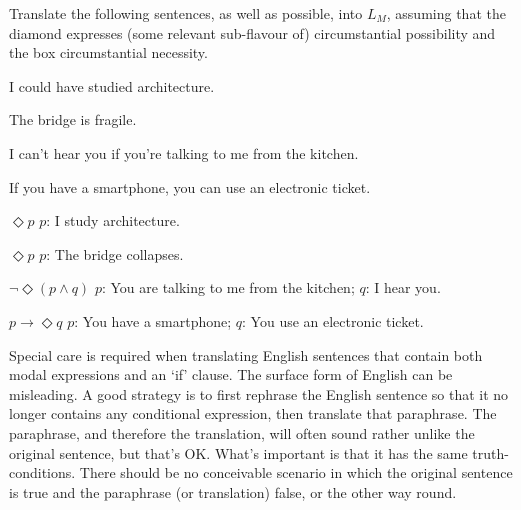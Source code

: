 \begin{exercise}
  Translate the following sentences, as well as possible, into $L_{M}$, assuming
  that the diamond expresses (some relevant sub-flavour of) circumstantial
  possibility and the box circumstantial necessity.
  \begin{exlist}
  \item I could have studied architecture.
  \item The bridge is fragile.
  \item I can't hear you if you're talking to me from the kitchen. 
  \item If you have a smartphone, you can use an electronic ticket.
    
  \end{exlist} 
\end{exercise}
\begin{solution}
  \begin{sollist}
    \item $\Diamond p$ \quad  $p$: I study architecture.
    \item $\Diamond p$ \quad  $p$: The bridge collapses.
    \item $\neg\Diamond(p \land q)$ \quad  $p$: You are talking to me from the kitchen; $q$: I hear you.
    \item $p \to \Diamond q$ \quad $p$: You have a smartphone; $q$: You use an electronic ticket.
  \end{sollist}
\end{solution}


Special care is required when translating English sentences that contain both
modal expressions and an `if' clause. The surface form of English can be
misleading. A good strategy is to first rephrase the English sentence so that it
no longer contains any conditional expression, then translate that paraphrase.
The paraphrase, and therefore the translation, will often sound rather unlike
the original sentence, but that's OK. What's important is that it has the same
truth-conditions. There should be no conceivable scenario in which the original
sentence is true and the paraphrase (or translation) false, or the other way
round.

